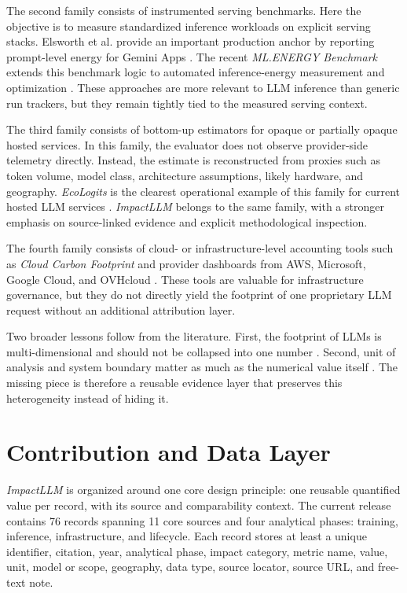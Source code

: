\documentclass[10pt,a4paper]{article}
\begin{document}
The second family consists of instrumented serving benchmarks. Here the objective is to measure standardized inference workloads on explicit serving stacks. Elsworth et al. provide an important production anchor by reporting prompt-level energy for Gemini Apps \cite{elsworth2025}. The recent \emph{ML.ENERGY Benchmark} extends this benchmark logic to automated inference-energy measurement and optimization \cite{mlenergy2025}. These approaches are more relevant to LLM inference than generic run trackers, but they remain tightly tied to the measured serving context.

The third family consists of bottom-up estimators for opaque or partially opaque hosted services. In this family, the evaluator does not observe provider-side telemetry directly. Instead, the estimate is reconstructed from proxies such as token volume, model class, architecture assumptions, likely hardware, and geography. \emph{EcoLogits} is the clearest operational example of this family for current hosted LLM services \cite{ecologits2026}. \emph{ImpactLLM} belongs to the same family, with a stronger emphasis on source-linked evidence and explicit methodological inspection.

The fourth family consists of cloud- or infrastructure-level accounting tools such as \emph{Cloud Carbon Footprint} \cite{cloudcarbonfootprint2026} and provider dashboards from AWS, Microsoft, Google Cloud, and OVHcloud \cite{awsccft2026,azureeid2026,gcloudcarbon2026,ovhtracker2024}. These tools are valuable for infrastructure governance, but they do not directly yield the footprint of one proprietary LLM request without an additional attribution layer.

Two broader lessons follow from the literature. First, the footprint of LLMs is multi-dimensional and should not be collapsed into one number \cite{rillig2023,li2025water,morrison2025}. Second, unit of analysis and system boundary matter as much as the numerical value itself \cite{ren2024}. The missing piece is therefore a reusable evidence layer that preserves this heterogeneity instead of hiding it.

\section{Contribution and Data Layer}
\emph{ImpactLLM} is organized around one core design principle: one reusable quantified value per record, with its source and comparability context. The current release contains 76 records spanning 11 core sources and four analytical phases: training, inference, infrastructure, and lifecycle. Each record stores at least a unique identifier, citation, year, analytical phase, impact category, metric name, value, unit, model or scope, geography, data type, source locator, source URL, and free-text note.
\end{document}
